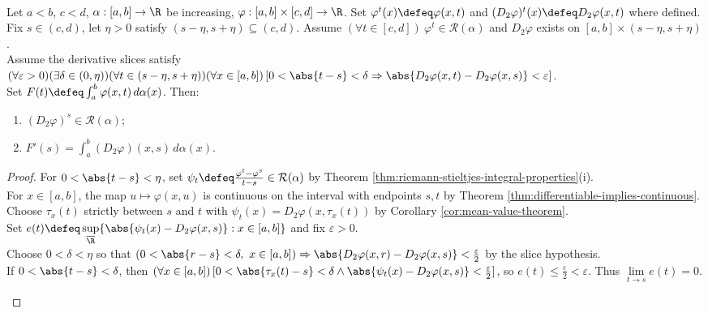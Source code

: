 \begin{theorem} \label{thm:differentiation-under-riemann-stieltjes-integral} \\
Let $a<b$, $c<d$, $\alpha:[a,b]\to\R$ be increasing, $\varphi:[a,b]\times[c,d]\to\R$. Set $\varphi^t(x)\defeq\varphi(x,t)$ and $(D_2\varphi)^t(x)\defeq D_2\varphi(x,t)$ where defined.\\
Fix $s\in(c,d)$, let $\eta>0$ satisfy $(s-\eta,s+\eta)\subseteq(c,d)$. Assume $(\forall t\in[c,d])\ \varphi^t\in\mathcal{R}(\alpha)$ and $D_2\varphi$ exists on $[a,b]\times(s-\eta,s+\eta)$.\\
Assume the derivative slices satisfy $(\forall\varepsilon>0)(\exists\delta\in(0,\eta))(\forall t\in(s-\eta,s+\eta))(\forall x\in[a,b])\,[0<\abs{t-s}<\delta\Rightarrow\abs{D_2\varphi(x,t)-D_2\varphi(x,s)}<\varepsilon]$.\\
Set $F(t)\defeq\int_a^b \varphi(x,t)\,d\alpha(x)$. Then:
\begin{enumerate}[label=(\roman*)]
\setlength{\itemsep}{0pt}
\item $(D_2\varphi)^s\in\mathcal{R}(\alpha)$;
\item $F'(s)=\int_a^b (D_2\varphi)(x,s)\,d\alpha(x)$.
\end{enumerate}
\begin{proof}
For $0<\abs{t-s}<\eta$, set $\psi_t\defeq\frac{\varphi^t-\varphi^s}{t-s}\in\mathcal{R}(\alpha)$ by Theorem \ref{thm:riemann-stieltjes-integral-properties}(i).\\
For $x\in[a,b]$, the map $u\mapsto\varphi(x,u)$ is continuous on the interval with endpoints $s,t$ by Theorem \ref{thm:differentiable-implies-continuous}.\\
Choose $\tau_x(t)$ strictly between $s$ and $t$ with $\psi_t(x)=D_2\varphi(x,\tau_x(t))$ by Corollary \ref{cor:mean-value-theorem}.\\
Set $e(t)\defeq\sup\limits_{\overline{\R}}\{\abs{\psi_t(x)-D_2\varphi(x,s)}:x\in[a,b]\}$ and fix $\varepsilon>0$.\\
Choose $0<\delta<\eta$ so that $(0<\abs{r-s}<\delta,\ x\in[a,b])\Rightarrow\abs{D_2\varphi(x,r)-D_2\varphi(x,s)}<\frac{\varepsilon}{2}$ by the slice hypothesis.\\
If $0<\abs{t-s}<\delta$, then $(\forall x\in[a,b])\,[0<\abs{\tau_x(t)-s}<\delta\land\abs{\psi_t(x)-D_2\varphi(x,s)}<\frac{\varepsilon}{2}]$, so $e(t)\leq\frac{\varepsilon}{2}<\varepsilon$. Thus $\lim\limits_{t\to s}e(t)=0$.
\begin{enumerate}[label=(\roman*)]

\end{enumerate}
\end{proof}
\end{theorem}
